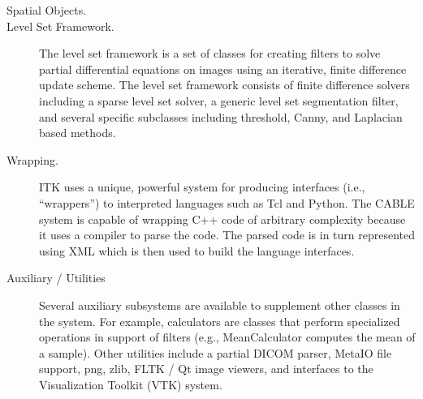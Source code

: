 \begin{description}
	\item[Spatial Objects.]

	\item[Level Set Framework.] The level set framework is a set of
        classes for creating filters to solve partial differential equations
        on images using an iterative, finite difference update scheme. The
        level set framework consists of finite difference solvers including a
        sparse level set solver, a generic level set segmentation filter, and
        several specific subclasses including threshold, Canny, and Laplacian
        based methods.

	\item[Wrapping.] ITK uses a unique, powerful system for producing
        interfaces (i.e., ``wrappers'') to interpreted languages such as Tcl
        and Python. The CABLE system is capable of wrapping C++ code of
        arbitrary complexity because it uses a compiler to parse the code.
        The parsed code is in turn represented using XML which is then
        used to build the language interfaces.

	\item[Auxiliary / Utilities] Several auxiliary subsystems are 
        available to supplement other classes in the system. For example,
        calculators are classes that perform specialized operations in
        support of filters (e.g., MeanCalculator computes the mean of a
        sample). Other utilities include a partial DICOM parser, MetaIO file
        support, png, zlib, FLTK / Qt image viewers, and interfaces to the
        Visualization Toolkit (VTK) system.
        
\end{description}


